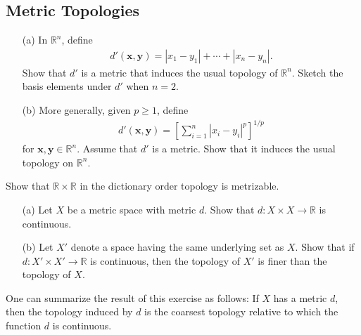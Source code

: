 \subsection{Metric Topologies}

  \begin{exercise}[Munkres 20.1]
    \begin{enumerate} 
      \item[(a)] In $\mathbb{R}^n$, define
      \begin{align*}
        d'(\mathbf{x}, \mathbf{y}) = |x_1 - y_1| + \cdots + |x_n - y_n|.
      \end{align*}
      Show that $d'$ is a metric that induces the usual topology of $\mathbb{R}^n$. Sketch the basis elements under $d'$ when $n = 2$.
      
      \item[(b)] More generally, given $p \geq 1$, define
      \begin{align*}
        d'(\mathbf{x}, \mathbf{y}) = \left[\sum_{i=1}^{n} |x_i - y_i|^p\right]^{1/p}
      \end{align*}
      for $\mathbf{x}, \mathbf{y} \in \mathbb{R}^n$. Assume that $d'$ is a metric. Show that it induces the usual topology on $\mathbb{R}^n$.
    \end{enumerate}
  \end{exercise}

  \begin{exercise}[Munkres 20.2]
    Show that $\mathbb{R} \times \mathbb{R}$ in the dictionary order topology is metrizable.
  \end{exercise}

  \begin{exercise}[Munkres 20.3]
    \begin{enumerate} 
      \item[(a)] Let $X$ be a metric space with metric $d$. Show that $d : X \times X \to \mathbb{R}$ is continuous.
      
      \item[(b)] Let $X'$ denote a space having the same underlying set as $X$. Show that if $d : X' \times X' \to \mathbb{R}$ is continuous, then the topology of $X'$ is finer than the topology of $X$.
    \end{enumerate}
    
    One can summarize the result of this exercise as follows: If $X$ has a metric $d$, then the topology induced by $d$ is the coarsest topology relative to which the function $d$ is continuous.
  \end{exercise}

